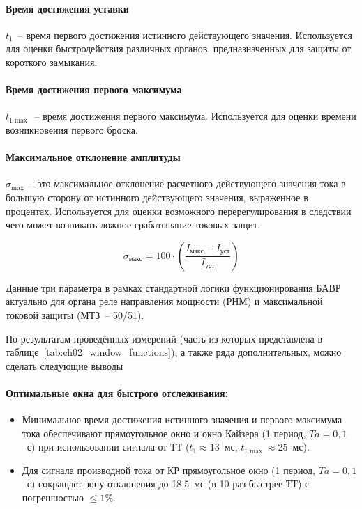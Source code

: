 \paragraph{Время достижения уставки}

$t_1$~-- время первого достижения истинного действующего значения. Используется для оценки быстродействия различных органов, предназначенных для защиты от короткого замыкания.

\paragraph{Время достижения первого максимума}

$t_{1\max}$~-- время достижения первого максимума. Используется для оценки времени возникновения первого броска.

\paragraph{Максимальное отклонение амплитуды}

$\sigma_{\max}$~-- это максимальное отклонение расчетного действующего значения тока в большую сторону от истинного действующего значения, выраженное в процентах. Используется для оценки возможного перерегулирования в следствии чего может возникать ложное срабатывание токовых защит.

\begin{equation}
\label{eq:ch02_max_amplitude_deviation}
\sigma_{\text{макс}} = 100 \cdot \left( \frac{I_{\text{макс}} - I_{\text{уст}}}{I_{\text{уст}}} \right)
\end{equation}

Данные три параметра в рамках стандартной логики функционирования БАВР актуально для
органа реле направления мощности (РНМ) и максимальной токовой защиты (МТЗ~-- 50/51).

По результатам проведённых измерений (часть из которых представлена в
таблице~\ref{tab:ch02_window_functions}), а также ряда дополнительных, можно сделать
следующие выводы

\paragraph{Оптимальные окна для быстрого отслеживания:}
\begin{itemize}[noitemsep,topsep=2pt]
\item Минимальное время достижения истинного значения и первого максимума тока обеспечивают прямоугольное окно и окно Кайзера (1 период, $Ta=0{,}1$~с) при использовании сигнала от ТТ ($t_1 \approx 13$~мс, $t_{1\max} \approx 25$~мс).
\item Для сигнала производной тока от КР прямоугольное окно (1 период, $Ta=0{,}1$~с) сокращает зону отклонения до 18,5~мс (в 10 раз быстрее ТТ) с погрешностью $\le 1\%$.
\end{itemize}

